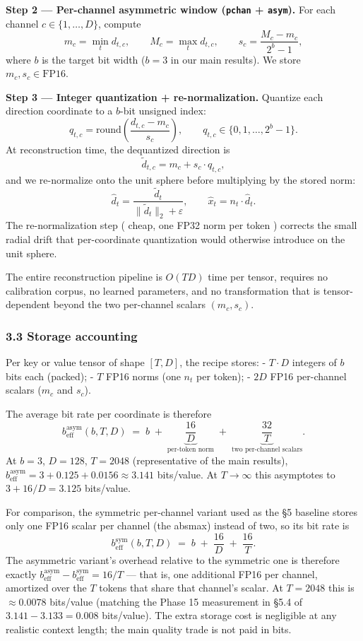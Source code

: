 \textbf{Step 2 --- Per-channel asymmetric window (\texttt{pchan} +
\texttt{asym}).} For each channel \(c \in \{1, \dots, D\}\), compute \[
m_c = \min_{t} d_{t,c},\qquad M_c = \max_{t} d_{t,c},\qquad s_c = \frac{M_c - m_c}{2^{b} - 1},
\] where \(b\) is the target bit width (\(b = 3\) in our main results).
We store \(m_c, s_c \in \text{FP16}\).

\textbf{Step 3 --- Integer quantization + re-normalization.} Quantize
each direction coordinate to a \(b\)-bit unsigned index: \[
q_{t,c} = \mathrm{round}\!\left(\frac{d_{t,c} - m_c}{s_c}\right),\qquad q_{t,c} \in \{0, 1, \dots, 2^b - 1\}.
\] At reconstruction time, the dequantized direction is \[
\tilde{d}_{t,c} = m_c + s_c \cdot q_{t,c},
\] and we re-normalize onto the unit sphere before multiplying by the
stored norm: \[
\hat{d}_t = \frac{\tilde{d}_t}{\|\tilde{d}_t\|_2 + \varepsilon},\qquad \hat{x}_t = n_t \cdot \hat{d}_t.
\] The re-normalization step ( cheap, one FP32 norm per token ) corrects
the small radial drift that per-coordinate quantization would otherwise
introduce on the unit sphere.

The entire reconstruction pipeline is \(O(T D)\) time per tensor,
requires no calibration corpus, no learned parameters, and no
transformation that is tensor-dependent beyond the two per-channel
scalars \((m_c, s_c)\).

\subsubsection{3.3 Storage accounting}\label{storage-accounting}

Per key or value tensor of shape \([T, D]\), the recipe stores: -
\(T \cdot D\) integers of \(b\) bits each (packed); - \(T\) FP16 norms
(one \(n_t\) per token); - \(2D\) FP16 per-channel scalars (\(m_c\) and
\(s_c\)).

The average bit rate per coordinate is therefore \[
b_\text{eff}^\text{asym}(b, T, D) \;=\; b \;+\; \underbrace{\frac{16}{D}}_{\text{per-token norm}} \;+\; \underbrace{\frac{32}{T}}_{\text{two per-channel scalars}}.
\] At \(b = 3\), \(D = 128\), \(T = 2048\) (representative of the main
results),
\(b_\text{eff}^\text{asym} = 3 + 0.125 + 0.0156 \approx 3.141\)
bits/value. At \(T \to \infty\) this asymptotes to \(3 + 16/D = 3.125\)
bits/value.

For comparison, the symmetric per-channel variant used as the §5
baseline stores only one FP16 scalar per channel (the absmax) instead of
two, so its bit rate is \[
b_\text{eff}^\text{sym}(b, T, D) \;=\; b \;+\; \frac{16}{D} \;+\; \frac{16}{T}.
\] The asymmetric variant's overhead relative to the symmetric one is
therefore exactly
\(b_\text{eff}^\text{asym} - b_\text{eff}^\text{sym} = 16/T\) --- that
is, one additional FP16 per channel, amortized over the \(T\) tokens
that share that channel's scalar. At \(T = 2048\) this is
\(\approx 0.0078\) bits/value (matching the Phase 15 measurement in §5.4
of \(3.141 - 3.133 = 0.008\) bits/value). The extra storage cost is
negligible at any realistic context length; the main quality trade is
not paid in bits.

